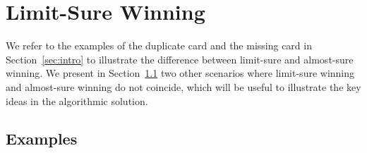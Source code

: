 \documentclass[a4paper,USenglish,cleveref, autoref, thm-restate]{lipics-v2021}
\begin{document}
\section{Limit-Sure Winning}\label{section:limitsure}
We refer to the examples of the duplicate card and the missing card in Section~\ref{sec:intro} to illustrate the
difference between limit-sure and almost-sure winning. We present in Section~\ref{sec:example-as-ls} two other scenarios where limit-sure winning and almost-sure winning do not coincide, which will be useful to illustrate the key ideas in the algorithmic solution.

\subsection{Examples}\label{sec:example-as-ls}
\end{document}
